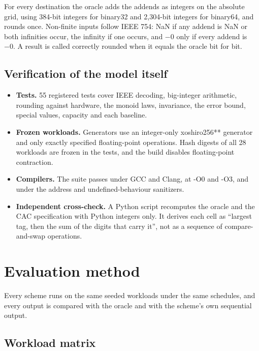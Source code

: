 \documentclass[3p,10pt]{elsarticle}
\begin{document}
For every destination the oracle adds the addends as integers on the
absolute grid, using 384-bit integers for binary32 and 2,304-bit
integers for binary64, and rounds once. Non-finite inputs follow IEEE
754: NaN if any addend is NaN or both infinities occur, the infinity if
one occurs, and −0 only if every addend is −0. A result is called
correctly rounded when it equals the oracle bit for bit.

\hypertarget{verification-of-the-model-itself}{%
\subsection{Verification of the model
itself}\label{verification-of-the-model-itself}}

\begin{itemize}
\item
  \textbf{Tests.} 55 registered tests cover IEEE decoding, big-integer
  arithmetic, rounding against hardware, the monoid laws, invariance,
  the error bound, special values, capacity and each baseline.
\item
  \textbf{Frozen workloads.} Generators use an integer-only xoshiro256**
  generator and only exactly specified floating-point operations. Hash
  digests of all 28 workloads are frozen in the tests, and the build
  disables floating-point contraction.
\item
  \textbf{Compilers.} The suite passes under GCC and Clang, at -O0 and
  -O3, and under the address and undefined-behaviour sanitizers.
\item
  \textbf{Independent cross-check.} A Python script recomputes the
  oracle and the CAC specification with Python integers only. It derives
  each cell as ``largest tag, then the sum of the digits that carry
  it'', not as a sequence of compare-and-swap operations.
\end{itemize}

\hypertarget{evaluation-method}{%
\section{Evaluation method}\label{evaluation-method}}

Every scheme runs on the same seeded workloads under the same schedules,
and every output is compared with the oracle and with the scheme's own
sequential output.

\hypertarget{workload-matrix}{%
\subsection{Workload matrix}\label{workload-matrix}}
\end{document}
